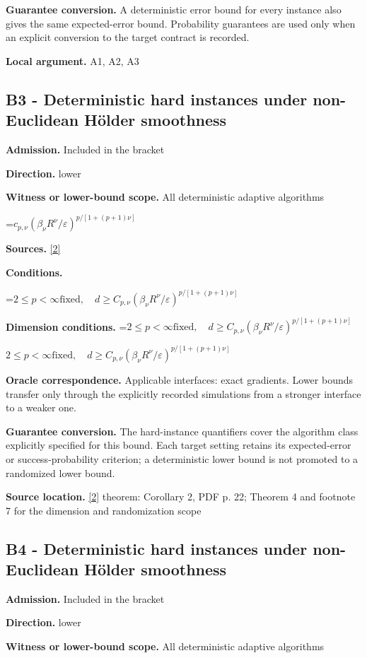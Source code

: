 \documentclass[10pt,a4paper]{article}
\newcommand{\AtlasMath}[1]{\par\begingroup\centering\setbox0=\hbox{$\displaystyle #1$}\ifdim\wd0>1.4\linewidth\typeout{ATLAS WIDE FORMULA: \the\wd0}\fi\ifdim\wd0>\linewidth\resizebox{\linewidth}{!}{\box0}\else\box0\fi\par\endgroup}
\newcommand{\AtlasInlineMath}[1]{\begingroup\setbox0=\hbox{$#1$}\ifdim\wd0>.4\linewidth\endgroup\AtlasMath{#1}\else\endgroup$#1$\fi}
\begin{document}
\textbf{Guarantee conversion.} A deterministic error bound for every instance also gives the same expected-error bound. Probability guarantees are used only when an explicit conversion to the target contract is recorded.

\textbf{Local argument.} A1, A2, A3

\subsection{B3 - Deterministic hard instances under non-Euclidean Hölder smoothness}
\textbf{Admission.} Included in the bracket

\textbf{Direction.} lower

\textbf{Witness or lower-bound scope.} All deterministic adaptive algorithms

\AtlasMath{c_{p,\nu}(\beta_\nu R^\nu/\varepsilon)^{p/[1+(p+1)\nu]}}
\textbf{Sources.} \href{https://arxiv.org/pdf/2101.11041v2}{[2]}

\textbf{Conditions.} 
\AtlasMath{2\le p<\infty\text{fixed},\quad d\ge C_{p,\nu}(\beta_\nu R^\nu/\varepsilon)^{p/[1+(p+1)\nu]}}


\textbf{Dimension conditions.} \AtlasInlineMath{2\le p<\infty\text{fixed},\quad d\ge C_{p,\nu}(\beta_\nu R^\nu/\varepsilon)^{p/[1+(p+1)\nu]}}

\textbf{Oracle correspondence.} Applicable interfaces: exact gradients. Lower bounds transfer only through the explicitly recorded simulations from a stronger interface to a weaker one.

\textbf{Guarantee conversion.} The hard-instance quantifiers cover the algorithm class explicitly specified for this bound. Each target setting retains its expected-error or success-probability criterion; a deterministic lower bound is not promoted to a randomized lower bound.

\textbf{Source location.} \href{https://arxiv.org/pdf/2101.11041v2}{[2]} theorem: Corollary 2, PDF p. 22; Theorem 4 and footnote 7 for the dimension and randomization scope

\subsection{B4 - Deterministic hard instances under non-Euclidean Hölder smoothness}
\textbf{Admission.} Included in the bracket

\textbf{Direction.} lower

\textbf{Witness or lower-bound scope.} All deterministic adaptive algorithms
\end{document}
